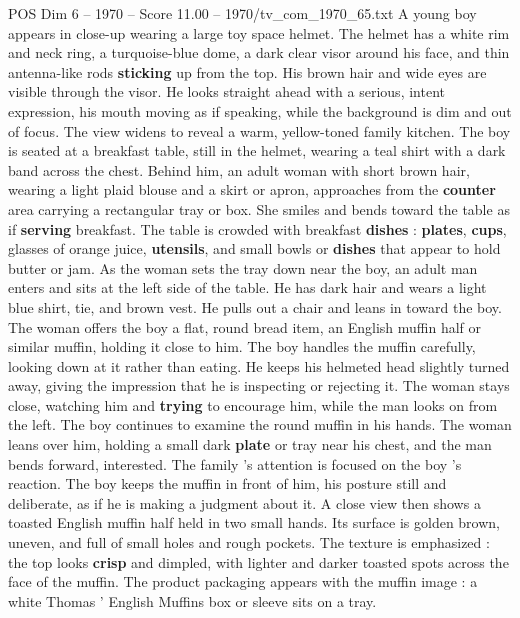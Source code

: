 \begin{textsample}{POS Dim 6 – 1970 – Score 11.00 – 1970/tv\_com\_1970\_65.txt}  \label{ex:f6_pos_042}
A young boy appears in close-up wearing a large toy space helmet.
The helmet has a white rim and neck ring, a turquoise-blue dome, a dark clear visor around his face, and thin antenna-like rods \textbf{sticking} up from the top.
His brown hair and wide eyes are visible through the visor.
He looks straight ahead with a serious, intent expression, his mouth moving as if speaking, while the background is dim and out of focus.
The view widens to reveal a warm, yellow-toned family kitchen.
The boy is seated at a breakfast table, still in the helmet, wearing a teal shirt with a dark band across the chest.
Behind him, an adult woman with short brown hair, wearing a light plaid blouse and a skirt or apron, approaches from the \textbf{counter} area carrying a rectangular tray or box.
She smiles and bends toward the table as if \textbf{serving} breakfast.
The table is crowded with breakfast \textbf{dishes} : \textbf{plates}, \textbf{cups}, glasses of orange juice, \textbf{utensils}, and small bowls or \textbf{dishes} that appear to hold butter or jam.
As the woman sets the tray down near the boy, an adult man enters and sits at the left side of the table.
He has dark hair and wears a light blue shirt, tie, and brown vest.
He pulls out a chair and leans in toward the boy.
The woman offers the boy a flat, round bread item, an English muffin half or similar muffin, holding it close to him.
The boy handles the muffin carefully, looking down at it rather than eating.
He keeps his helmeted head slightly turned away, giving the impression that he is inspecting or rejecting it.
The woman stays close, watching him and \textbf{trying} to encourage him, while the man looks on from the left.
The boy continues to examine the round muffin in his hands.
The woman leans over him, holding a small dark \textbf{plate} or tray near his chest, and the man bends forward, interested.
The family ’s attention is focused on the boy ’s reaction.
The boy keeps the muffin in front of him, his posture still and deliberate, as if he is making a judgment about it.
A close view then shows a toasted English muffin half held in two small hands.
Its surface is golden brown, uneven, and full of small holes and rough pockets.
The texture is emphasized : the top looks \textbf{crisp} and dimpled, with lighter and darker toasted spots across the face of the muffin.
The product packaging appears with the muffin image : a white Thomas ’ English Muffins box or sleeve sits on a tray.

\end{textsample}
